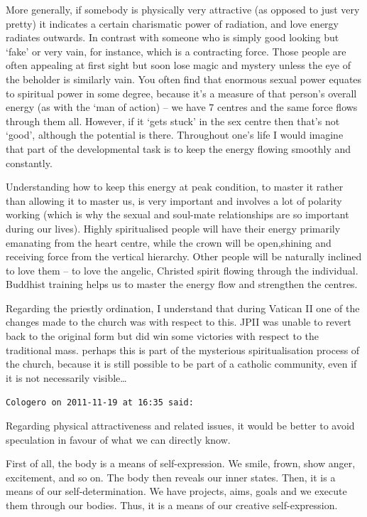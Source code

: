 \begin{footnotesize}
\begin{sffamily}
More generally, if somebody is physically very attractive (as opposed to just very pretty) it indicates a certain charismatic power of radiation, and love energy radiates outwards. In contrast with someone who is simply good looking but `fake' or very vain, for instance, which is a contracting force. Those people are often appealing at first sight but soon lose magic and mystery unless the eye of the beholder is similarly vain. You often find that enormous sexual power equates to spiritual power in some degree, because it's a measure of that person's overall energy (as with the `man of action) – we have 7 centres and the same force flows through them all. However, if it `gets stuck' in the sex centre then that's not `good', although the potential is there. Throughout one's life I would imagine that part of the developmental task is to keep the energy flowing smoothly and constantly. 

Understanding how to keep this energy at peak condition, to master it rather than allowing it to master us, is very important and involves a lot of polarity working (which is why the sexual and soul-mate relationships are so important during our lives). Highly spiritualised people will have their energy primarily emanating from the heart centre, while the crown will be open,shining and receiving force from the vertical hierarchy. Other people will be naturally inclined to love them – to love the angelic, Christed spirit flowing through the individual. Buddhist training helps us to master the energy flow and strengthen the centres.

Regarding the priestly ordination, I understand that during Vatican II one of the changes made to the church was with respect to this. JPII was unable to revert back to the original form but did win some victories with respect to the traditional mass. perhaps this is part of the mysterious spiritualisation process of the church, because it is still possible to be part of a catholic community, even if it is not necessarily visible…


\hfill

\texttt{Cologero on 2011-11-19 at 16:35 said: }

Regarding physical attractiveness and related issues, it would be better to avoid speculation in favour of what we can directly know.

First of all, the body is a means of self-expression. We smile, frown, show anger, excitement, and so on. The body then reveals our inner states. Then, it is a means of our self-determination. We have projects, aims, goals and we execute them through our bodies. Thus, it is a means of our creative self-expression.


\end{sffamily}
\end{footnotesize}
